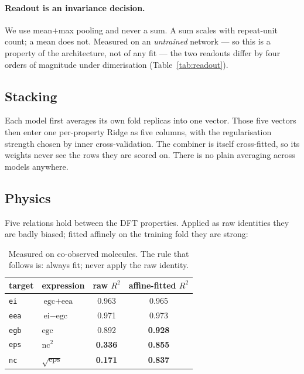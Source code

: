 \documentclass[11pt,a4paper]{article}
\newcommand{\prop}[1]{\texttt{#1}}
\newcommand{\R}{$R^2$}
\begin{document}
\paragraph{Readout is an invariance decision.} We use mean$+$max pooling and
never a sum. A sum scales with repeat-unit count; a mean does not. Measured on an
\emph{untrained} network --- so this is a property of the architecture, not of
any fit --- the two readouts differ by four orders of magnitude under
dimerisation (Table~\ref{tab:readout}).

\subsection{Stacking}

Each model first averages its own fold replicas into one vector. Those five
vectors then enter one per-property Ridge as five columns, with the
regularisation strength chosen by inner cross-validation. The combiner is
itself cross-fitted, so its weights never see the rows they are scored on. There
is no plain averaging across models anywhere.

\subsection{Physics}
\label{sec:physics}

Five relations hold between the DFT properties. Applied as raw identities they
are badly biased; fitted affinely on the training fold they are strong:

\begin{table}[h]
\centering
\small
\begin{tabular}{llcc}
\toprule
target & expression & raw \R{} & affine-fitted \R{} \\
\midrule
\prop{ei}  & $\text{egc} + \text{eea}$ & 0.963 & 0.965 \\
\prop{eea} & $\text{ei} - \text{egc}$  & 0.971 & 0.973 \\
\prop{egb} & $\text{egc}$              & 0.892 & \textbf{0.928} \\
\prop{eps} & $\text{nc}^2$             & \textbf{0.336} & \textbf{0.855} \\
\prop{nc}  & $\sqrt{\text{eps}}$       & \textbf{0.171} & \textbf{0.837} \\
\bottomrule
\end{tabular}
\caption{Measured on co-observed molecules. The rule that follows is: always
fit; never apply the raw identity.}
\end{table}
\end{document}
